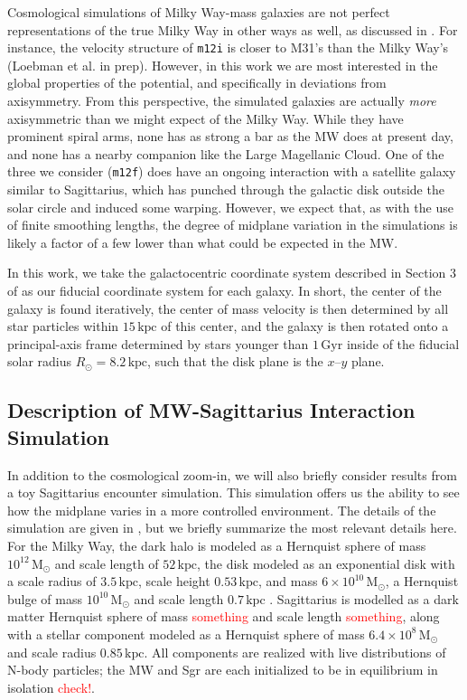 \documentclass[twocolumn]{aastex62}
\newcommand{\Gus}[1]{\textcolor{red}{#1}}
\newcommand{\Msun}{\ensuremath{\text{M}_\odot}}
\newcommand{\kpc}{\text{kpc}}
\newcommand{\Gyr}{\text{Gyr}}
\newcommand{\mi}{\texttt{m12i}}
\newcommand{\mf}{\texttt{m12f}}
\begin{document}
Cosmological simulations of Milky Way-mass galaxies are not perfect
representations of the true Milky Way in other ways as well, as discussed in
\citet{2018arXiv180610564S}. For instance, the velocity structure of \mi{} is
closer to M31's than the Milky Way's (Loebman et al. in prep). However, in
this work we are most interested in the global properties of the potential,
and specifically in deviations from axisymmetry. From this perspective, the
simulated galaxies are actually \emph{more} axisymmetric than we might expect
of the Milky Way. While they have prominent spiral arms, none has as strong a
bar as the MW does at present day, and none has a nearby companion like the
Large Magellanic Cloud. One of the three we consider (\mf) does have an
ongoing interaction with a satellite galaxy similar to Sagittarius, which has
punched through the galactic disk outside the solar circle and induced some
warping. However, we expect that, as with the use of finite smoothing lengths,
the degree of midplane variation in the simulations is likely a factor of a
few lower than what could be expected in the MW.

In this work, we take the galactocentric coordinate system described in
Section 3 of \citet{2018arXiv180610564S} as our fiducial coordinate system for
each galaxy. In short, the center of the galaxy is found iteratively, the
center of mass velocity is then determined by all star particles within
$15\,\kpc$ of this center, and the galaxy is then rotated onto a
principal-axis frame determined by stars younger than $1\,\Gyr$ inside of the
fiducial solar radius $R_{\odot} = 8.2\,\kpc$, such that the disk plane is the
$x$--$y$ plane.

\subsection{Description of MW-Sagittarius Interaction Simulation} \label{ssec:sag_sim}
In addition to the cosmological zoom-in, we will also briefly consider results
from a toy Sagittarius encounter simulation. This simulation offers us the
ability to see how the midplane varies in a more controlled environment. The
details of the simulation are given in \citet{2018MNRAS.481..286L}, but we
briefly summarize the most relevant details here. For the Milky Way, the dark
halo is modeled as a Hernquist sphere of mass $10^{12}\,\Msun$ and scale
length of $52\,\kpc$, the disk modeled as an exponential disk with a scale
radius of $3.5\,\kpc$, scale height $0.53\,\kpc$, and mass
$6\times10^{10}\,\Msun$, a Hernquist bulge of mass $10^{10}\,\Msun$ and scale
length $0.7\,\kpc$ \citep{1990ApJ...356..359H}. Sagittarius is modelled as a
dark matter Hernquist sphere of mass \Gus{something} and scale length
\Gus{something}, along with a stellar component modeled as a Hernquist sphere
of mass $6.4\times10^8\,\Msun$ and scale radius $0.85\,\kpc$. All components are realized with live distributions of N-body particles; the MW and Sgr are each initialized to be in equilibrium in isolation \Gus{check!}.
\end{document}
